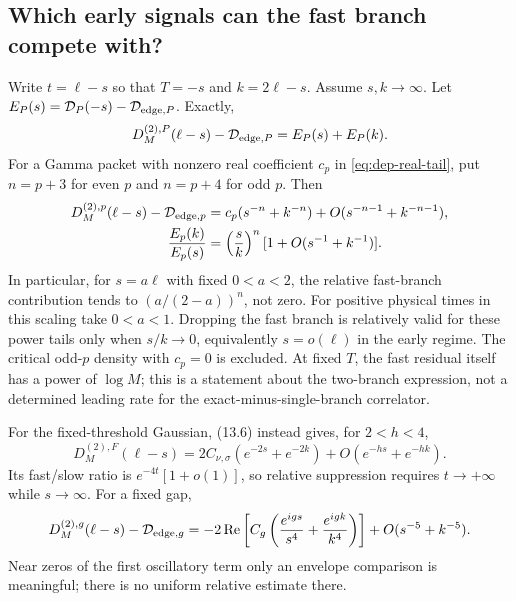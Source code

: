 \subsection{Which early signals can the fast branch compete with?}
Write $t=\ell-s$ so that $T=-s$ and $k=2\ell-s$. Assume $s,k\to\infty$.
Let $E_P(s)=\mathcal D_P(-s)-\mathcal D_{{\rm edge},P}$. Exactly,
\begin{equation}
 D^{(2),P}_M(\ell-s)-\mathcal D_{{\rm edge},P}=E_P(s)+E_P(k).
 \label{eq:tb-early-sum}
\end{equation}
For a Gamma packet with nonzero real coefficient $c_p$ in \eqref{eq:dep-real-tail}, put
$n=p+3$ for even $p$ and $n=p+4$ for odd $p$. Then
\begin{align}
 D^{(2),p}_M(\ell-s)-\mathcal D_{{\rm edge},p}
 &=c_p(s^{-n}+k^{-n})+O(s^{-n-1}+k^{-n-1}),\notag\\
 \frac{E_p(k)}{E_p(s)}
 &=\left(\frac{s}{k}\right)^n[1+O(s^{-1}+k^{-1})].
 \label{eq:tb-power-window}
\end{align}
In particular, for $s=a\ell$ with fixed $0<a<2$, the relative
fast-branch contribution tends to $(a/(2-a))^n$, not zero.
For positive physical times in this scaling take $0<a<1$.
Dropping the fast branch is relatively valid for these power tails
only when $s/k\to0$, equivalently $s=o(\ell)$ in the early regime.
The critical odd-$p$ density with $c_p=0$ is excluded.
At fixed $T$, the fast residual itself has a power of $\log M$;
this is a statement about the two-branch expression, not a determined
leading rate for the exact-minus-single-branch correlator.

For the fixed-threshold Gaussian, (13.6) instead gives, for $2<h<4$,
\begin{equation}
 D^{(2),F}_M(\ell-s)
 =2C_{\nu,\sigma}(e^{-2s}+e^{-2k})
      +O(e^{-hs}+e^{-hk}).
 \label{eq:tb-exponential-window}
\end{equation}
Its fast/slow ratio is $e^{-4t}[1+o(1)]$, so relative suppression
requires $t\to+\infty$ while $s\to\infty$. For a fixed gap,
\begin{equation}
 D^{(2),g}_M(\ell-s)-\mathcal D_{{\rm edge},g}
 =-2\operatorname{Re}\left[C_g\left(\frac{e^{igs}}{s^4}
                          +\frac{e^{igk}}{k^4}\right)\right]
    +O(s^{-5}+k^{-5}).
 \label{eq:tb-gap-window}
\end{equation}
Near zeros of the first oscillatory term only an envelope comparison
is meaningful; there is no uniform relative estimate there.

